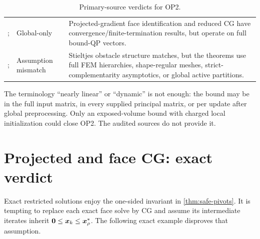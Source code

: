 \begin{table}[t]
\begin{tabularx}{\textwidth}{@{}p{}p{}X@{}}
\citet{more1991solution}; \citet{dostal2011superrelaxation} & Global-only & Projected-gradient
face identification and reduced CG have convergence/finite-termination
results, but operate on full bound-QP vectors. \\
\citet{kornhuber1994monotone}; \citet{karkkainen2003augmented} & Assumption mismatch & Stieltjes
obstacle structure matches, but the theorems use full FEM hierarchies,
shape-regular meshes, strict-complementarity asymptotics, or global active
partitions. \\
\bottomrule
\end{tabularx}
\caption{Primary-source verdicts for OP2.}
\label{tab:literature}
\end{table}

The terminology ``nearly linear'' or ``dynamic'' is not enough: the bound may
be in the full input matrix, in every supplied principal matrix, or per update
after global preprocessing.  Only an exposed-volume bound with charged local
initialization could close OP2.  The audited sources do not provide it.

\section{Projected and face CG: exact verdict}
\label{sec:cg-verdict}

Exact restricted solutions enjoy the one-sided invariant in
\cref{thm:safe-pivots}.  It is tempting to replace each exact face solve by CG
and assume its intermediate iterates inherit
$\bm{0}\leq\bm{x}_k\leq\bm{x}_\rho^*$.  The following exact example disproves that
assumption.

